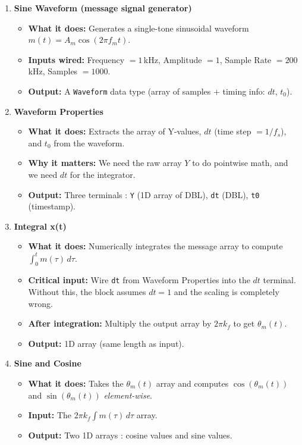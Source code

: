 \documentclass[../../main.tex]{subfiles}
\begin{document}
\begin{enumerate}[leftmargin=2em]

\item \textbf{Sine Waveform (message signal generator)}
  \begin{itemize}[leftmargin=1.5em]
    \item \textbf{What it does:} Generates a single-tone sinusoidal waveform $m(t) = A_m \cos(2\pi f_m t)$.
    \item \textbf{Inputs wired:} Frequency $= 1$\,kHz, Amplitude $= 1$, Sample Rate $= 200$\,kHz, Samples $= 1000$.
    \item \textbf{Output:} A \texttt{Waveform} data type (array of samples + timing info: $dt$, $t_0$).
  \end{itemize}

\item \textbf{Waveform Properties}
  \begin{itemize}[leftmargin=1.5em]
    \item \textbf{What it does:} Extracts the array of Y-values, $dt$ (time step $= 1/f_s$), and $t_0$ from the waveform.
    \item \textbf{Why it matters:} We need the raw array $Y$ to do pointwise math, and we need $dt$ for the integrator.
    \item \textbf{Output:} Three terminals : \texttt{Y} (1D array of DBL), \texttt{dt} (DBL), \texttt{t0} (timestamp).
  \end{itemize}

\item \textbf{Integral x(t)}
  \begin{itemize}[leftmargin=1.5em]
    \item \textbf{What it does:} Numerically integrates the message array to compute $\int_0^t m(\tau)\,d\tau$.
    \item \textbf{Critical input:} Wire \texttt{dt} from Waveform Properties into the $dt$ terminal. Without this, the block assumes $dt = 1$ and the scaling is completely wrong.
    \item \textbf{After integration:} Multiply the output array by $2\pi k_f$ to get $\theta_m(t)$.
    \item \textbf{Output:} 1D array (same length as input).
  \end{itemize}

\item \textbf{Sine and Cosine}
  \begin{itemize}[leftmargin=1.5em]
    \item \textbf{What it does:} Takes the $\theta_m(t)$ array and computes $\cos(\theta_m(t))$ and $\sin(\theta_m(t))$ \emph{element-wise}.
    \item \textbf{Input:} The $2\pi k_f \int m(\tau)\,d\tau$ array.
    \item \textbf{Output:} Two 1D arrays : cosine values and sine values.
  \end{itemize}


\end{enumerate}
\end{document}
